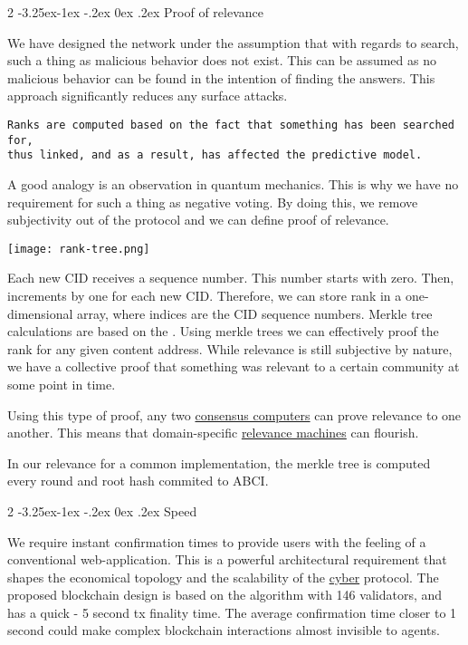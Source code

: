 \documentclass[8pt,oneside]{amsart}
\makeatletter
\newcommand{\linkred}[2]{\href{#1}{\color{red}{#2}}}
\newcommand{\linkgreen}[2]{\href{#1}{\color{green}{#2}}}
\renewcommand\subsection{\@startsection{subsection}
                                    {2}{\z@}
                                    {-3.25ex\@plus -1ex \@minus -.2ex}
                                    {0ex \@plus .2ex}
                                    {\play\Large}
                        }
\newcommand{\titleSection}[1]{\subsection{#1}}
\newenvironment{Figure}
  {\par\medskip\noindent\minipage{\linewidth}}
  {\endminipage\par\medskip}
\makeatother
\begin{document}
\titleSection{Proof of relevance}\label{proof-of-relevance}

We have designed the network under the assumption that with regards to search, such a thing as malicious behavior does not exist. This can be assumed as no malicious behavior can be found in the intention of finding the answers. This approach significantly reduces any surface attacks.

\begin{lstlisting}
Ranks are computed based on the fact that something has been searched for,
thus linked, and as a result, has affected the predictive model.
\end{lstlisting}

A good analogy is an observation in quantum mechanics. This is why we have no requirement for such a thing as negative voting. By doing this, we remove subjectivity out of the protocol and we can define proof of relevance.

\begin{Figure}
    \centering
    \texttt{[image: rank-tree.png]}
\end{Figure}

Each new CID receives a sequence number. This number starts with zero. Then, increments by one for each new CID. Therefore, we can store rank in a one-dimensional array, where indices are the CID sequence numbers. Merkle tree calculations are based on the \linkgreen{https://ipfs.io/ipfs/QmUUTW5gpJx7g5QF3PRkhjkk7jqs3r8EWcuVpZ9dHfx7DE}{RFC-6962 standard}. Using merkle trees we can effectively proof the rank for any given content address. While relevance is still subjective by nature, we have a collective proof that something was relevant to a certain community at some point in time.

Using this type of proof, any two \linkgreen{https://ipfs.io/ipfs/QmdCeixQUHBjGnKfwbB1dxf4X8xnadL8xWmmEnQah5n7x2}{IBC compatible} {\hyperref[consensus-computer]{consensus computers}} can prove relevance to one another. This means that domain-specific {\hyperref[relevance-machine]{relevance machines}} can flourish.

In our relevance for a common \linkred{https://github.ccom/cybercongress/cyberd}{cyberd} implementation, the merkle tree is computed every round and root hash commited to ABCI.

\titleSection{Speed}\label{speed}

We require instant confirmation times to provide users with the feeling of a conventional web-application. This is a powerful architectural requirement that shapes the economical topology and the scalability of the {\hyperref[cyber]{cyber}} protocol. The proposed blockchain design is based on the \linkgreen{https://ipfs.io/ipfs/QmaMtD7xDgghqgjN62zWZ5TBGFiEjGQtuZBjJ9sMh816KJ}{Tendermint consensus} algorithm with 146 validators, and has a quick - 5 second tx finality time. The average confirmation time closer to 1 second could make complex blockchain interactions almost invisible to agents.
\end{document}

